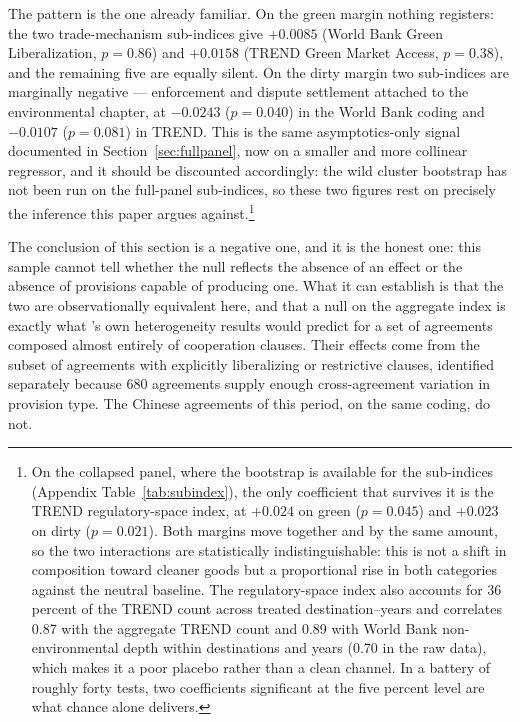 \documentclass[12pt]{article}
\begin{document}
The pattern is the one already familiar. On the green margin nothing registers: the two
trade-mechanism sub-indices give $+0.0085$ (World Bank Green Liberalization, $p = 0.86$) and
$+0.0158$ (TREND Green Market Access, $p = 0.38$), and the remaining five are equally silent. On the
dirty margin two sub-indices are marginally negative --- enforcement and dispute settlement attached
to the environmental chapter, at $-0.0243$ ($p = 0.040$) in the World Bank coding and $-0.0107$
($p = 0.081$) in TREND. This is the same asymptotics-only signal documented in
Section~\ref{sec:fullpanel}, now on a smaller and more collinear regressor, and it should be
discounted accordingly: the wild cluster bootstrap has not been run on the full-panel sub-indices, so
these two figures rest on precisely the inference this paper argues against.\footnote{On the
collapsed panel, where the bootstrap is available for the sub-indices (Appendix
Table~\ref{tab:subindex}), the only coefficient that survives it is the TREND regulatory-space index,
at $+0.024$ on green ($p = 0.045$) and $+0.023$ on dirty ($p = 0.021$). Both margins move together and
by the same amount, so the two interactions are statistically indistinguishable: this is not a shift
in composition toward cleaner goods but a proportional rise in both categories against the neutral
baseline. The regulatory-space index also accounts for 36 percent of the TREND count across treated
destination--years and correlates 0.87 with the aggregate TREND count and 0.89 with World Bank non-environmental depth within destinations and years (0.70 in the raw data), which makes it a poor placebo rather than a
clean channel. In a battery of roughly forty tests, two coefficients significant at the five percent
level are what chance alone delivers.}

The conclusion of this section is a negative one, and it is the honest one: this sample cannot tell
whether the null reflects the absence of an effect or the absence of provisions capable of producing
one. What it can establish is that the two are observationally equivalent here, and that a null on
the aggregate index is exactly what \citet{brandi2020}'s own heterogeneity results would predict for
a set of agreements composed almost entirely of cooperation clauses. Their effects come from the
subset of agreements with explicitly liberalizing or restrictive clauses, identified separately
because 680 agreements supply enough cross-agreement variation in provision type. The Chinese
agreements of this period, on the same coding, do not.
\end{document}
